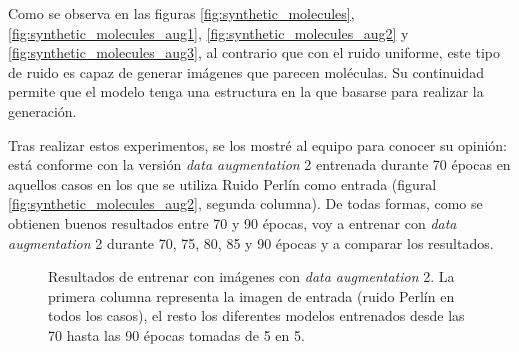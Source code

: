 Como se observa en las figuras \ref{fig:synthetic_molecules}, \ref{fig:synthetic_molecules_aug1}, \ref{fig:synthetic_molecules_aug2} y \ref{fig:synthetic_molecules_aug3}, al contrario que con el ruido uniforme, este tipo de ruido es capaz de generar imágenes que parecen moléculas. Su continuidad permite que el modelo tenga una estructura en la que basarse para realizar la generación. 

Tras realizar estos experimentos, se los mostré al equipo para conocer su opinión: está conforme con la versión \textit{data augmentation} 2 entrenada durante 70 épocas en aquellos casos en los que se utiliza Ruido Perlín como entrada (figural \ref{fig:synthetic_molecules_aug2}, segunda columna). De todas formas, como se obtienen buenos resultados entre 70 y 90 épocas, voy a entrenar con \textit{data augmentation} 2 durante 70, 75, 80, 85 y 90 épocas y a comparar los resultados.

\begin{figure}[H]
\centering
    \caption{Resultados de entrenar con imágenes con \textit{data augmentation} 2. La primera columna representa la imagen de entrada (ruido Perlín en todos los casos), el resto los diferentes modelos entrenados desde las 70 hasta las 90 épocas tomadas de 5 en 5.}
    \label{fig:synthetic_molecules_aug2_extra} 
\end{figure}


